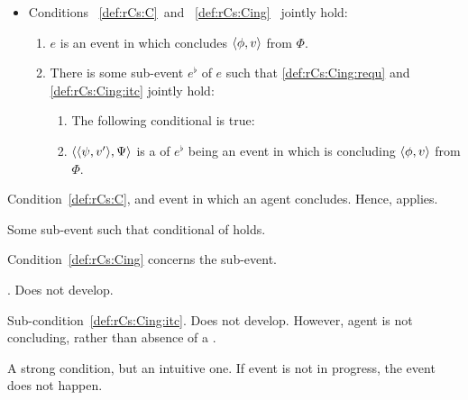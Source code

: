 \begin{note}
\begin{definition}[\rCon{2}]
    \begin{itemize}
    \item
      Conditions~%
      \ref{def:rCs:C}~and~%
      \ref{def:rCs:Cing}~%
      jointly hold:
      \begin{enumerate}[label=\arabic*., ref=(\arabic*)]
      \item
        \label{def:rCs:C}
        \(e\) is an event in which \vAgent{} concludes \(\langle \phi, v \rangle\) from \(\Phi\).
      \item
        \label{def:rCs:Cing}
        There is some sub-event \(e^{\flat}\) of \(e\) such that \ref{def:rCs:Cing:requ} and \ref{def:rCs:Cing:itc} jointly hold:
        \begin{enumerate}[label=\alph*., ref=(\arabic{enumi}\alph*)]
        \item
          \label{def:rCs:Cing:itc}
          The following conditional is true:
        \item
          \label{def:rCs:Cing:requ}
          \(\langle \langle \psi, v' \rangle, \Psi \rangle\) is a \requ{} of \(e^{\flat}\) being an event in which \vAgent{} is concluding \(\langle \phi, v \rangle\) from \(\Phi\).
        \end{enumerate}
      \end{enumerate}
    \end{itemize}
    \vspace{-1.5\baselineskip}
  \end{definition}

  Condition~\ref{def:rCs:C}, and event in which an agent concludes.
  Hence, \qWhyV{} applies.

  Some sub-event such that conditional of \qWhyV{} holds.

  Condition~\ref{def:rCs:Cing} concerns the sub-event.

  \ros{}.
  Does not develop.

  Sub-condition~\ref{def:rCs:Cing:itc}.
  Does not develop.
  However, agent is not concluding, rather than absence of a \ros{}.

  A strong condition, but an intuitive one.
  If event is not in progress, the event does not happen.


\end{note}
